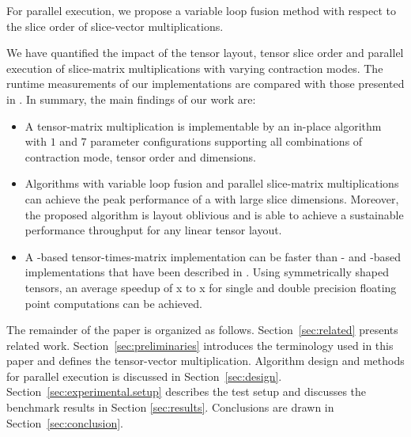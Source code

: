 For parallel execution, we propose a variable loop fusion method with respect to the slice order of slice-vector multiplications. 


We have quantified the impact of the tensor layout, tensor slice order and parallel execution of slice-matrix multiplications with varying contraction modes.
The runtime measurements of our implementations are compared with those presented in \cite{springer:2018:design, abadi:2016:tensorflow,matthews:2018:high}.
In summary, the main findings of our work are:
\begin{itemize}
	\item 
	A tensor-matrix multiplication is implementable by an in-place algorithm with $1$  and $7$  parameter configurations supporting all combinations of contraction mode, tensor order and dimensions.
	\item 
	Algorithms with variable loop fusion and parallel slice-matrix multiplications can achieve the peak performance of a  with large slice dimensions. %
	Moreover, the proposed algorithm is layout oblivious and is able to achieve a sustainable performance throughput for any linear tensor layout.
	\item
	A -based tensor-times-matrix implementation can be faster than - and -based implementations that have been described in \cite{springer:2018:design, matthews:2018:high}.
	Using symmetrically shaped tensors, an average speedup of \tq x to \tq x for single and double precision floating point computations can be achieved.
\end{itemize}

The remainder of the paper is organized as follows. 
Section~\ref{sec:related} presents related work.
Section~\ref{sec:preliminaries} introduces the terminology used in this paper and defines the tensor-vector multiplication.
Algorithm design and methods for parallel execution is discussed in Section~\ref{sec:design}.
Section~\ref{sec:experimental.setup} describes the test setup and discusses the benchmark results in Section \ref{sec:results}.
Conclusions are drawn in Section~\ref{sec:conclusion}.


